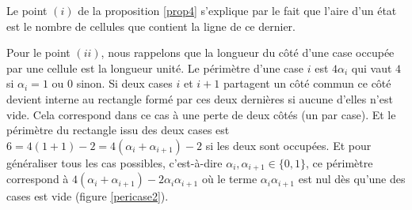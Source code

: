 \begin{Pre}
Le point $(i)$ de la proposition \ref{prop4} s'explique par le fait que  l'aire d'un état est le nombre de cellules que contient la ligne de ce dernier.
   
Pour  le point  $(ii)$, nous rappelons que la longueur du côté d'une case occupée par une cellule est la longueur unité. Le périmètre d'une case $i$ est $4\alpha_{i}$ qui vaut $4$ si $\alpha_{i}=1$ ou $0$ sinon.
Si deux cases $i$ et $i+1$ partagent un côté commun ce côté devient interne au rectangle formé par ces deux dernières si aucune d'elles n'est vide. Cela correspond dans ce cas à une perte de deux côtés (un par case). Et le périmètre du rectangle issu des deux cases est $6=4(1+1)-2= 4(\alpha_{i} + \alpha_{i+1})-2$ si les deux sont occupées. Et pour généraliser tous les cas possibles, c'est-à-dire  $\alpha_{i} , \alpha_{i+1} \in \{0,1\}$, ce périmètre correspond à
$4(\alpha_{i} + \alpha_{i+1})-2\alpha_{i}\alpha_{i+1}$ où  le terme $\alpha_{i}\alpha_{i+1}$  est nul dès qu'une des cases est vide (figure \ref{pericase2}).
\begin{figure}[!htb]
\begin{minipage}[c]{.16\linewidth}
  \centering
  \begin{logicpuzzle}[rows=1,columns=2,color=cyan!100, width=750px,scale=0.5]


\end{logicpuzzle}
\end{minipage}
\end{figure}
\end{Pre}
